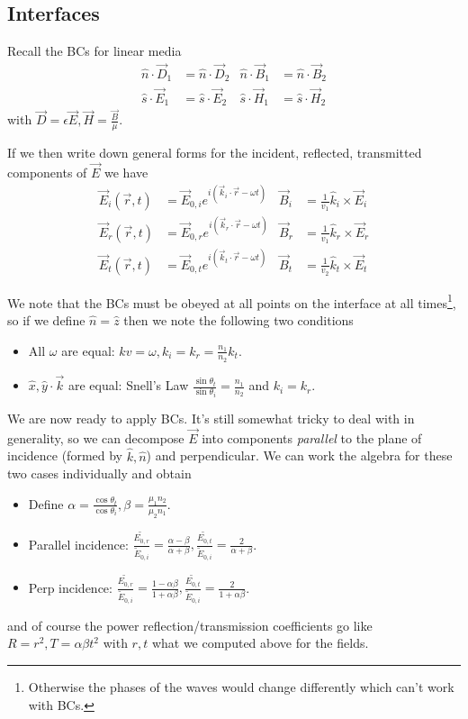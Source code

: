 \documentclass[10pt,twocolumn]{article}
\begin{document}
\subsection{Interfaces}

Recall the BCs for linear media
\begin{align}
    \hat{n} \cdot \vec{D}_1 &= \hat{n} \cdot \vec{D}_2 & \hat{n} \cdot \vec{B}_1 &= \hat{n} \cdot \vec{B}_2\\
    \hat{s} \cdot \vec{E}_1 &= \hat{s} \cdot \vec{E}_2 & \hat{s} \cdot \vec{H}_1 &= \hat{s} \cdot \vec{H}_2
\end{align}
with $\vec{D} = \epsilon \vec{E}, \vec{H} = \frac{\vec{B}}{\mu}$. 

If we then write down general forms for the incident, reflected, transmitted components of $\vec{E}$ we have
\begin{align}
    \vec{E}_i(\vec{r},t) &= \vec{E}_{0,i}e^{i(\vec{k}_i \cdot \vec{r} - \omega t)}& \vec{B}_i &= \frac{1}{v_1}\hat{k}_i \times \vec{E}_i\\
    \vec{E}_r(\vec{r},t) &= \vec{E}_{0,r}e^{i(\vec{k}_r \cdot \vec{r} - \omega t)}& \vec{B}_r &= \frac{1}{v_1}\hat{k}_r \times \vec{E}_r\\
    \vec{E}_t(\vec{r},t) &= \vec{E}_{0,t}e^{i(\vec{k}_t \cdot \vec{r} - \omega t)}& \vec{B}_t &= \frac{1}{v_2}\hat{k}_t \times \vec{E}_t
\end{align}

We note that the BCs must be obeyed at all points on the interface at all times\footnote{Otherwise the phases of the waves would change differently which can't work with BCs.}, so if we define $\hat{n} = \hat{z}$ then we note the following two conditions
\begin{itemize}
    \item All $\omega$ are equal: $kv = \omega, k_i = k_r = \frac{n_1}{n_2}k_t$.
    \item $\hat{x}, \hat{y} \cdot \vec{k}$ are equal: Snell's Law $\frac{\sin \theta_t}{\sin \theta_i} = \frac{n_1}{n_2}$ and $k_i = k_r$.
\end{itemize}

We are now ready to apply BCs. It's still somewhat tricky to deal with in generality, so we can decompose $\vec{E}$ into components \emph{parallel} to the plane of incidence (formed by $\hat{k}, \hat{n}$) and perpendicular. We can work the algebra for these two cases individually and obtain
\begin{itemize}
    \item Define $\alpha = \frac{\cos \theta_t}{\cos \theta_i}, \beta = \frac{\mu_1n_2}{\mu_2n_1}$.
    \item Parallel incidence: $\frac{\tilde{E_{0,r}}}{\tilde{E}_{0,i}} = \frac{\alpha - \beta}{\alpha + \beta}, \frac{\tilde{E_{0,t}}}{\tilde{E}_{0,i}} = \frac{2}{\alpha + \beta}$.
    \item Perp incidence: $\frac{\tilde{E_{0,r}}}{\tilde{E}_{0,i}} = \frac{1 - \alpha \beta}{1 + \alpha \beta}, \frac{\tilde{E_{0,t}}}{\tilde{E}_{0,i}} = \frac{2}{1 + \alpha \beta}$.
\end{itemize}
and of course the power reflection/transmission coefficients go like $R = r^2, T = \alpha \beta t^2$ with $r,t$ what we computed above for the fields.
\end{document}
